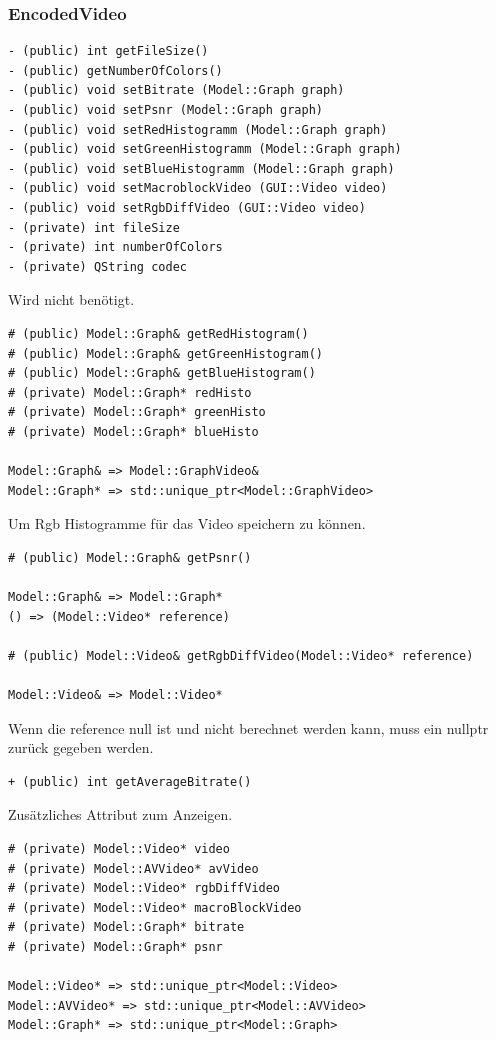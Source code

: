 \documentclass{scrartcl}
\begin{document}
{\subsubsection{EncodedVideo}
\bigskip
\begin{verbatim}
- (public) int getFileSize()
- (public) getNumberOfColors()
- (public) void setBitrate (Model::Graph graph)
- (public) void setPsnr (Model::Graph graph)
- (public) void setRedHistogramm (Model::Graph graph)
- (public) void setGreenHistogramm (Model::Graph graph)
- (public) void setBlueHistogramm (Model::Graph graph)
- (public) void setMacroblockVideo (GUI::Video video)
- (public) void setRgbDiffVideo (GUI::Video video)
- (private) int fileSize
- (private) int numberOfColors
- (private) QString codec
\end{verbatim}
Wird nicht benötigt.
\bigskip
\begin{verbatim}
# (public) Model::Graph& getRedHistogram()
# (public) Model::Graph& getGreenHistogram()
# (public) Model::Graph& getBlueHistogram()
# (private) Model::Graph* redHisto
# (private) Model::Graph* greenHisto
# (private) Model::Graph* blueHisto

Model::Graph& => Model::GraphVideo&
Model::Graph* => std::unique_ptr<Model::GraphVideo>
\end{verbatim}
Um Rgb Histogramme für das Video speichern zu können.
\bigskip
\begin{verbatim}
# (public) Model::Graph& getPsnr()

Model::Graph& => Model::Graph*
() => (Model::Video* reference)

# (public) Model::Video& getRgbDiffVideo(Model::Video* reference)

Model::Video& => Model::Video*
\end{verbatim}
Wenn die reference null ist und nicht berechnet werden kann, muss ein nullptr zurück gegeben werden.
\bigskip
\begin{verbatim}
+ (public) int getAverageBitrate()
\end{verbatim}
Zusätzliches Attribut zum Anzeigen.
\bigskip
\begin{verbatim}
# (private) Model::Video* video
# (private) Model::AVVideo* avVideo
# (private) Model::Video* rgbDiffVideo
# (private) Model::Video* macroBlockVideo
# (private) Model::Graph* bitrate
# (private) Model::Graph* psnr

Model::Video* => std::unique_ptr<Model::Video>
Model::AVVideo* => std::unique_ptr<Model::AVVideo>
Model::Graph* => std::unique_ptr<Model::Graph>


\end{verbatim}}
\end{document}
